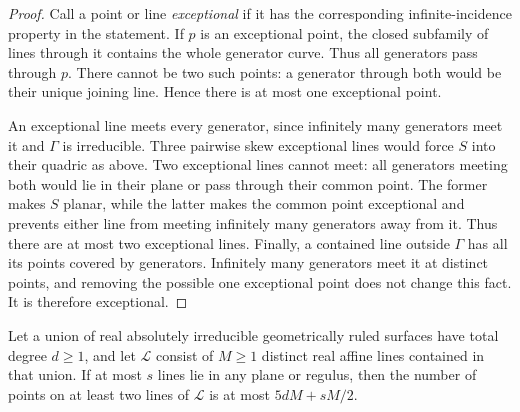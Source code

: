 \begin{proof}
Call a point or line \emph{exceptional} if it has the corresponding
infinite-incidence property in the statement.  If $p$ is an
exceptional point, the closed subfamily of lines through it contains
the whole generator curve.  Thus all generators pass through $p$.
There cannot be two such points: a generator through both would
be their unique joining line.  Hence there is at most one
exceptional point.

An exceptional line meets every generator, since infinitely many
generators meet it and $\Gamma$ is irreducible.  Three pairwise skew
exceptional lines would force $S$ into their quadric as above.
Two exceptional lines cannot meet: all generators meeting both
would lie in their plane or pass through their common point.
The former makes $S$ planar, while the latter makes the common
point exceptional and prevents either line from meeting infinitely
many generators away from it.  Thus there are at most two
exceptional lines.  Finally, a contained line outside $\Gamma$
has all its points covered by generators.  Infinitely many
generators meet it at distinct points, and removing the possible
one exceptional point does not change this fact.  It is therefore
exceptional.
\end{proof}

\begin{lemma}\label{ci:ruled-count}
Let a union of real absolutely irreducible geometrically ruled
surfaces have total degree $d\ge1$, and let $\mathcal L$ consist of
$M\ge1$ distinct real affine lines contained in that union.  If at
most $s$ lines lie in any plane or regulus, then the number of
points on at least two lines of $\mathcal L$ is at most
$5dM+sM/2$.
\end{lemma}

